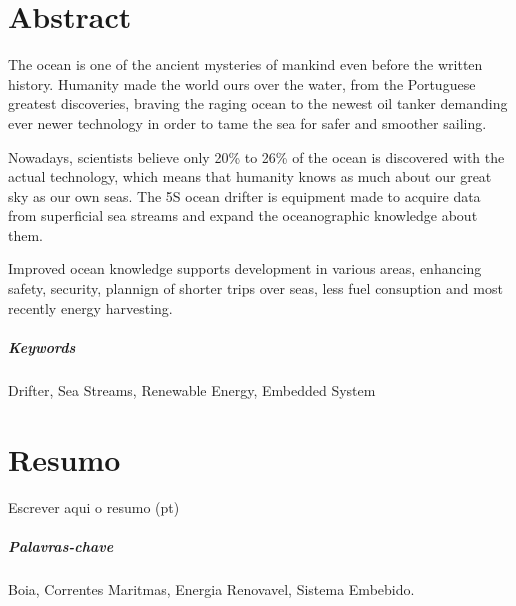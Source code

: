 \chapter*{Abstract}

The ocean is one of the ancient mysteries of mankind even before the written history. Humanity made the world ours over the water, 
from the Portuguese greatest discoveries, braving the raging ocean to the newest oil tanker demanding ever newer technology
in order to tame the sea for safer and smoother sailing.

Nowadays, scientists believe only 20\% to 26\% of the ocean is discovered with the actual technology, which means that humanity 
knows as much about our great sky as our own seas. The 5S ocean drifter is equipment made to acquire data from 
superficial sea streams and expand the oceanographic knowledge about them.

Improved ocean knowledge supports development in various areas, enhancing safety, security, plannign 
of shorter trips over seas, less fuel consuption and most recently energy harvesting.



\paragraph{Keywords} Drifter, Sea Streams, Renewable Energy, Embedded System

\cleardoublepage

\chapter*{Resumo}

Escrever aqui o resumo (pt)

\paragraph{Palavras-chave} Boia, Correntes Maritmas, Energia Renovavel, Sistema Embebido.

\cleardoublepage
